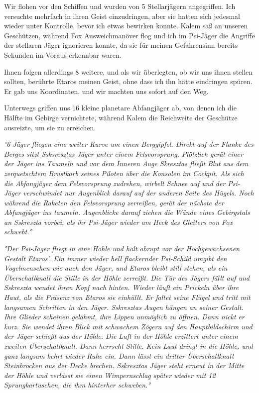 \documentclass[11pt]{article}
\begin{document}
Wir flohen vor den Schiffen und wurden von 5 Stellarjägern angegriffen.
Ich versuchte mehrfach in ihren Geist einzudringen, aber sie hatten sich
jedesmal wieder unter Kontrolle, bevor ich etwas bewirken konnte. Kalem
saß an unseren Geschützen, während Fox Ausweichmanöver flog und ich im
Psi-Jäger die Angriffe der stellaren Jäger ignorieren konnte, da sie für
meinen Gefahrensinn bereits Sekunden im Voraus erkennbar waren.

Ihnen folgen allerdings 8 weitere, und als wir überlegten, ob wir uns
ihnen stellen sollten, berührte Etaros meinen Geist, ohne dass ich ihn
hätte eindringen spüren. Er gab uns Koordinaten, und wir machten uns
sofort auf den Weg.

Unterwegs griffen uns 16 kleine planetare Abfangjäger ab, von denen ich
die Hälfte im Gebirge vernichtete, während Kalem die Reichweite der
Geschütze ausreizte, um sie zu erreichen.

\emph{°6 Jäger fliegen eine weiter Kurve um einen Berggipfel. Direkt auf
der Flanke des Berges sitzt Ssksresztas Jäger unter einem Felsvorsprung.
Plötzlich gerät einer der Jäger ins Taumeln und vor dem Inneren Auge
Skresztas fließt Blut aus dem zerquetschtem Brustkorb seines Piloten
über die Konsolen im Cockpit. Als sich die Abfangjäger dem Felsvorsprung
zudrehen, wirbelt Schnee auf und der Psi-Jäger verschwindet nur
Augenblick darauf auf der anderen Seite des Hügels. Noch während die
Raketen den Felsvorsprung zerreißen, gerät der nächste der Abfangjäger
ins taumeln. Augenblicke darauf ziehen die Wände eines Gebirgstals an
Sskreszta vorbei, als ihr Psi-Jäger wieder am Heck des Gleiters von Fox
schwebt.°}

\emph{°Der Psi-Jäger fliegt in eine Höhle und hält abrupt vor der
Hochgewachsenen Gestalt Etaros'. Ein immer wieder hell flackernder
Psi-Schild umgibt den Vogelmenschen wie auch den Jäger, und Etaros
bleibt still stehen, als ein Überschallknall die Stille in der Höhle
zerreißt. Die Tür des Jägers fällt auf und Sskreszta wendet ihren Kopf
nach hinten. Wieder läuft ein Prickeln über ihre Haut, als die Präsenz
von Etaros sie einhüllt. Er faltet seine Flügel und tritt mit langsamen
Schritten in den Jäger. Sskresztas Augen hängen an seiner Gestalt. Ihre
Glieder scheinen gelähmt, ihre Lippen unmöglich zu öffnen. Dann nickt er
kurz. Sie wendet ihren Blick mit schwachem Zögern auf den
Hauptbildschirm und der Jäger schießt aus der Höhle. Die Luft in der
Höhle erzittert unter einem zweiten Überschallknall. Dann herrscht
Stille. Kein Laut dringt in die Höhle, und ganz langsam kehrt wieder
Ruhe ein. Dann lässt ein dritter Überschallknall Steinbrocken aus der
Decke brechen. Sskresztas Jäger steht erneut in der Mitte der Höhle und
verlässt sie einen Wimpernschlag später wieder mit 12 Sprungkartuschen,
die ihm hinterher schweben.°}
\end{document}
